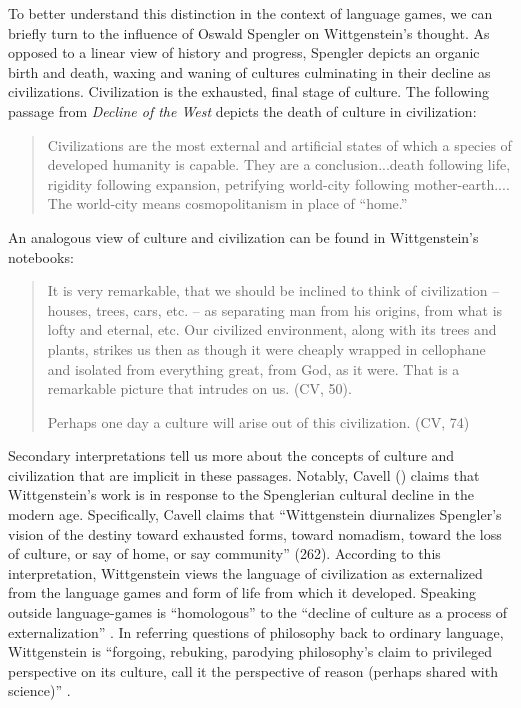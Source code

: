 To better understand this distinction in the context of language games, we can briefly turn to the influence of Oswald Spengler on Wittgenstein's thought. As opposed to a linear view of history and progress, Spengler depicts an organic birth and death, waxing and waning of cultures culminating in their decline as civilizations. Civilization is the exhausted, final stage of culture. The following passage from \textit{Decline of the West} depicts the death of culture in civilization:

\begin{quote}
Civilizations are the most external and artificial states of which a species of developed humanity is capable. They are a conclusion...death following life, rigidity following expansion, petrifying world-city following mother-earth.... The world-city means cosmopolitanism in place of ``home.'' \cite[24-25]{Spengler1965a}
\end{quote}

An analogous view of culture and civilization can be found in Wittgenstein's notebooks:

\begin{quote}
It is very remarkable, that we should be inclined to think of civilization -- houses, trees, cars, etc. -- as separating man from his origins, from what is lofty and eternal, etc. Our civilized environment, along with its trees and plants, strikes us then as though it were cheaply wrapped in cellophane and isolated from everything great, from God, as it were. That is a remarkable picture that intrudes on us. (CV, 50).

Perhaps one day a culture will arise out of this civilization. (CV, 74)
\end{quote}

Secondary interpretations tell us more about the concepts of culture and civilization that are implicit in these passages. Notably, Cavell (\citeyear{Cavell1988a,Cavell2013a}) claims that Wittgenstein's work is in response to the Spenglerian cultural decline in the modern age. Specifically, Cavell claims that ``Wittgenstein diurnalizes Spengler's vision of the destiny toward exhausted forms, toward nomadism, toward the loss of culture, or say of home, or say community'' (262). According to this interpretation, Wittgenstein views the language of civilization as externalized from the language games and form of life from which it developed. Speaking outside language-games is ``homologous'' to the ``decline of culture as a process of externalization'' \citep[261]{Cavell1988a}. In referring questions of philosophy back to ordinary language, Wittgenstein is ``forgoing, rebuking, parodying philosophy's claim to privileged perspective on its culture, call it the perspective of reason (perhaps shared with science)'' \citep[263]{Cavell1988a}.

